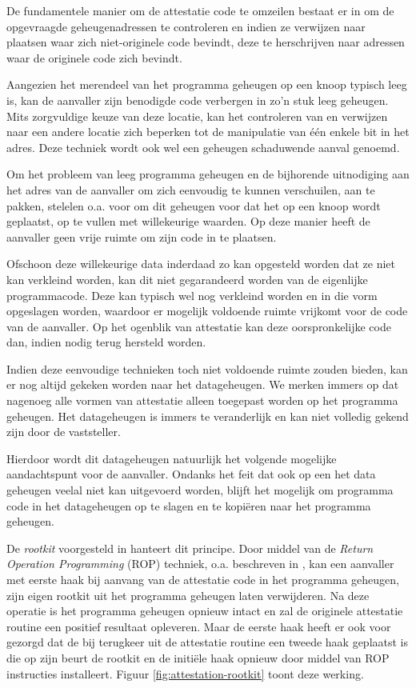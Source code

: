 De fundamentele manier om de attestatie code te omzeilen bestaat er in om de
opgevraagde geheugenadressen te controleren en indien ze verwijzen naar
plaatsen waar zich niet-originele code bevindt, deze te herschrijven naar
adressen waar de originele code zich bevindt.

Aangezien het merendeel van het programma geheugen op een knoop typisch leeg
is, kan de aanvaller zijn benodigde code verbergen in zo'n stuk leeg geheugen.
Mits zorgvuldige keuze van deze locatie, kan het controleren van en verwijzen
naar een andere locatie zich beperken tot de manipulatie van \'e\'en enkele bit
in het adres. Deze techniek wordt ook wel een geheugen schaduwende aanval
genoemd.

Om het probleem van leeg programma geheugen en de bijhorende uitnodiging aan
het adres van de aanvaller om zich eenvoudig te kunnen verschuilen, aan te
pakken, stelelen o.a. \citep{yang2007distributed,seshadri2008sake} voor om dit
geheugen voor dat het op een knoop wordt geplaatst, op te vullen met
willekeurige waarden. Op deze manier heeft de aanvaller geen vrije ruimte om
zijn code in te plaatsen.

Ofschoon deze willekeurige data inderdaad zo kan opgesteld worden dat ze niet
kan verkleind worden, kan dit niet gegarandeerd worden van de eigenlijke
programmacode. Deze kan typisch wel nog verkleind worden en in die vorm
opgeslagen worden, waardoor er mogelijk voldoende ruimte vrijkomt voor de code
van de aanvaller. Op het ogenblik van attestatie kan deze oorspronkelijke code
dan, indien nodig terug hersteld worden.

Indien deze eenvoudige technieken toch niet voldoende ruimte zouden bieden, kan
er nog altijd gekeken worden naar het datageheugen. We merken immers op dat
nagenoeg alle vormen van attestatie alleen toegepast worden op het programma
geheugen. Het datageheugen is immers te veranderlijk en kan niet volledig
gekend zijn door de vaststeller.

Hierdoor wordt dit datageheugen natuurlijk het volgende mogelijke
aandachtspunt voor de aanvaller. Ondanks het feit dat ook op een \mcu het data
geheugen veelal niet kan uitgevoerd worden, blijft het mogelijk om programma
code in het datageheugen op te slagen en te kopi\"eren naar het programma
geheugen.

De \emph{rootkit} voorgesteld in \citep{castelluccia2009difficulty} hanteert dit
principe. Door middel van de \emph{Return Operation Programming} (ROP)
techniek, o.a. beschreven in \citep{prandini2012return}, kan een aanvaller met
eerste haak bij aanvang van de attestatie code in het programma geheugen, zijn
eigen rootkit uit het programma geheugen laten verwijderen. Na deze operatie is
het programma geheugen opnieuw intact en zal de originele attestatie routine
een positief resultaat opleveren. Maar de eerste haak heeft er ook voor gezorgd
dat de bij terugkeer uit de attestatie routine een tweede haak geplaatst is die
op zijn beurt de rootkit en de initi\"ele haak opnieuw door middel van ROP
instructies installeert. Figuur \ref{fig:attestation-rootkit} toont deze
werking.

